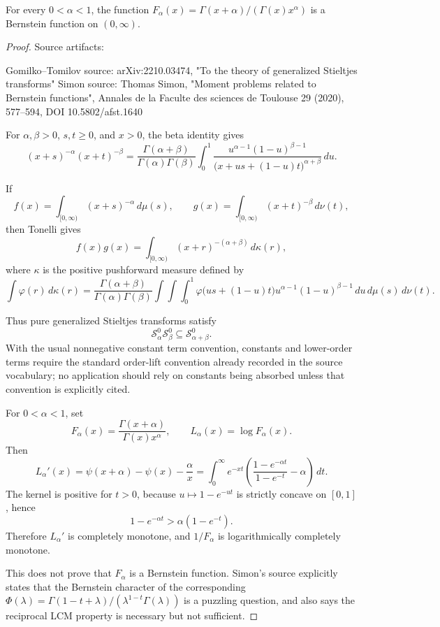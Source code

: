\begin{lemma}
\label{res:simon-gamma-quotient-bf-alpha-window-open-problem}
For every \(0<\alpha<1\), the function \(F_\alpha(x)=\Gamma(x+\alpha)/(\Gamma(x)x^\alpha)\) is a Bernstein function on \((0,\infty)\).
\end{lemma}
\begin{proof}
Source artifacts:

Gomilko--Tomilov source: arXiv:2210.03474, "To the theory of generalized Stieltjes transforms"
Simon source: Thomas Simon, "Moment problems related to Bernstein functions", Annales de la Faculte des sciences de Toulouse 29 (2020), 577--594, DOI 10.5802/afst.1640

For \(\alpha,\beta>0\), \(s,t\ge0\), and \(x>0\), the beta identity gives
\[
(x+s)^{-\alpha}(x+t)^{-\beta}
=
\frac{\Gamma(\alpha+\beta)}{\Gamma(\alpha)\Gamma(\beta)}
\int_0^1
\frac{u^{\alpha-1}(1-u)^{\beta-1}}
{\bigl(x+us+(1-u)t\bigr)^{\alpha+\beta}}
\,du.
\]

If
\[
f(x)=\int_{[0,\infty)}(x+s)^{-\alpha}\,d\mu(s),
\qquad
g(x)=\int_{[0,\infty)}(x+t)^{-\beta}\,d\nu(t),
\]
then Tonelli gives
\[
f(x)g(x)=\int_{[0,\infty)}(x+r)^{-(\alpha+\beta)}\,d\kappa(r),
\]
where \(\kappa\) is the positive pushforward measure defined by
\[
\int \varphi(r)\,d\kappa(r)
=
\frac{\Gamma(\alpha+\beta)}{\Gamma(\alpha)\Gamma(\beta)}
\int\!\!\int\!\!\int_0^1
\varphi\bigl(us+(1-u)t\bigr)
u^{\alpha-1}(1-u)^{\beta-1}
\,du\,d\mu(s)\,d\nu(t).
\]

Thus pure generalized Stieltjes transforms satisfy
\[
\mathcal S_\alpha^{0}\mathcal S_\beta^{0}\subseteq \mathcal S_{\alpha+\beta}^{0}.
\]
With the usual nonnegative constant term convention, constants and lower-order terms require the standard order-lift convention already recorded in the source vocabulary; no application should rely on constants being absorbed unless that convention is explicitly cited.

For \(0<\alpha<1\), set
\[
F_\alpha(x)=\frac{\Gamma(x+\alpha)}{\Gamma(x)x^\alpha},
\qquad
L_\alpha(x)=\log F_\alpha(x).
\]
Then
\[
L_\alpha'(x)
=
\psi(x+\alpha)-\psi(x)-\frac{\alpha}{x}
=
\int_0^\infty e^{-xt}
\left(
\frac{1-e^{-\alpha t}}{1-e^{-t}}-\alpha
\right)\,dt.
\]
The kernel is positive for \(t>0\), because \(u\mapsto 1-e^{-ut}\) is strictly concave on \([0,1]\), hence
\[
1-e^{-\alpha t}>\alpha(1-e^{-t}).
\]
Therefore \(L_\alpha'\) is completely monotone, and \(1/F_\alpha\) is logarithmically completely monotone.

This does not prove that \(F_\alpha\) is a Bernstein function. Simon's source explicitly states that the Bernstein character of the corresponding \(\Phi(\lambda)=\Gamma(1-t+\lambda)/(\lambda^{1-t}\Gamma(\lambda))\) is a puzzling question, and also says the reciprocal LCM property is necessary but not sufficient.
\end{proof}
